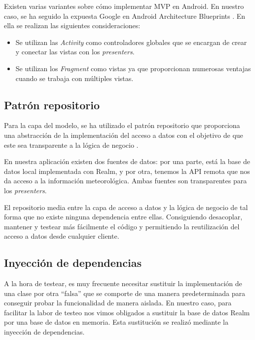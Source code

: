 Existen varias variantes sobre cómo implementar MVP en Android. En
nuestro caso, se ha seguido la expuesta Google en Android Architecture
Blueprints \citep{pattern:android_architecture}. En ella se realizan
las siguientes consideraciones:

\begin{itemize}
\tightlist
\item
  Se utilizan las \emph{Activity} como controladores globales que se
  encargan de crear y conectar las vistas con los \emph{presenters}.
\item
  Se utilizan los \emph{Fragment} como vistas ya que proporcionan
  numerosas ventajas cuando se trabaja con múltiples vistas.
\end{itemize}

\subsection{Patrón repositorio}\label{patron-repositorio}

Para la capa del modelo, se ha utilizado el patrón repositorio que
proporciona una abstracción de la implementación del acceso a datos con
el objetivo de que este sea transparente a la lógica de negocio
\citep{pattern:repository}.

En nuestra aplicación existen dos fuentes de datos: por una parte, está
la base de datos local implementada con Realm, y por otra, tenemos la
API remota que nos da acceso a la información meteorológica. Ambas
fuentes son transparentes para los \emph{presenters}.

El repositorio media entre la capa de acceso a datos y la lógica de
negocio de tal forma que no existe ninguna dependencia entre ellas.
Consiguiendo desacoplar, mantener y testear más fácilmente el código y
permitiendo la reutilización del acceso a datos desde cualquier cliente.


\subsection{Inyección de
dependencias}\label{inyeccion-de-dependencias}

A la hora de testear, es muy frecuente necesitar sustituir la
implementación de una clase por otra ``falsa'' que se comporte de una
manera predeterminada para conseguir probar la funcionalidad de manera
aislada. En nuestro caso, para facilitar la labor de testeo nos vimos
obligados a sustituir la base de datos Realm por una base de datos en
memoria. Esta sustitución se realizó mediante la inyección de
dependencias.

